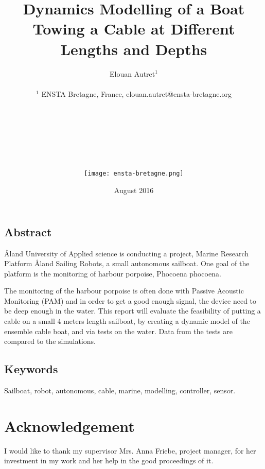 \documentclass[twoside,12pt]{report} %
\title{ Dynamics Modelling of a Boat Towing a Cable at Different Lengths and Depths }
\author{Elouan Autret$^{1}$\\
\\
\normalsize{$^{1}$ ENSTA Bretagne, France, elouan.autret@ensta-bretagne.org}\\\\\\\\\\\\\\\\
\texttt{[image: ensta-bretagne.png]}
}
\date{August 2016}
\begin{document}
\renewcommand{\contentsname}{Contents}	%
\renewcommand{\bibname}{Bibliography}	%


\vspace*{\fill}
\newpage

\section*{Abstract}

\r{A}land University of Applied science is conducting a project, Marine Research Platform \r{A}land Sailing Robots, a small autonomous sailboat. One goal of the platform is the monitoring of harbour porpoise, Phocoena phocoena.

The monitoring of the harbour porpoise is often done with Passive Acoustic Monitoring (PAM) and in order to get a good enough signal, the device need to be deep enough in the water. This report will evaluate the feasibility of putting a cable on a small 4 meters length sailboat, by creating a dynamic model of the ensemble cable boat, and via tests on the water. Data from the tests are compared to the simulations.

\section*{Keywords}

Sailboat, robot, autonomous, cable, marine, modelling, controller, sensor.


\chapter*{Acknowledgement}

I would like to thank my supervisor Mrs. Anna Friebe, project manager, for her investment in my work and her help in the good proceedings of it.
\end{document}

